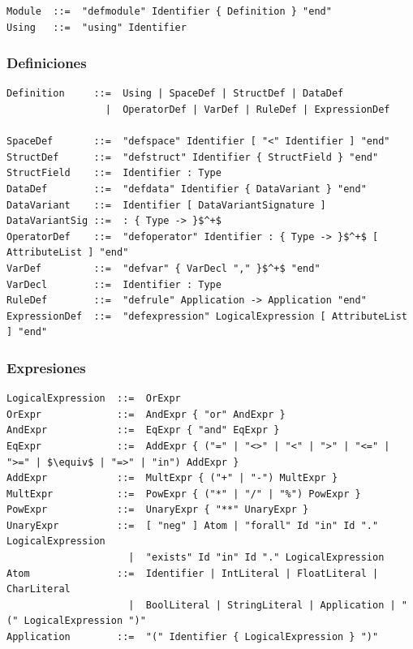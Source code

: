 \documentclass[12pt]{article}
\begin{document}
\begin{lstlisting}[style=rascalstyle, basicstyle=\ttfamily\small, mathescape]
Module  ::=  "defmodule" Identifier { Definition } "end"
Using   ::=  "using" Identifier
\end{lstlisting}

\subsubsection*{Definiciones}

\begin{lstlisting}[style=rascalstyle, basicstyle=\ttfamily\small, mathescape, breaklines=false]
Definition     ::=  Using | SpaceDef | StructDef | DataDef
                 |  OperatorDef | VarDef | RuleDef | ExpressionDef

SpaceDef       ::=  "defspace" Identifier [ "<" Identifier ] "end"
StructDef      ::=  "defstruct" Identifier { StructField } "end"
StructField    ::=  Identifier : Type
DataDef        ::=  "defdata" Identifier { DataVariant } "end"
DataVariant    ::=  Identifier [ DataVariantSignature ]
DataVariantSig ::=  : { Type -> }$^+$
OperatorDef    ::=  "defoperator" Identifier : { Type -> }$^+$ [ AttributeList ] "end"
VarDef         ::=  "defvar" { VarDecl "," }$^+$ "end"
VarDecl        ::=  Identifier : Type
RuleDef        ::=  "defrule" Application -> Application "end"
ExpressionDef  ::=  "defexpression" LogicalExpression [ AttributeList ] "end"
\end{lstlisting}

\subsubsection*{Expresiones}

\begin{lstlisting}[style=rascalstyle, basicstyle=\ttfamily\small, mathescape, breaklines=false]
LogicalExpression  ::=  OrExpr
OrExpr             ::=  AndExpr { "or" AndExpr }
AndExpr            ::=  EqExpr { "and" EqExpr }
EqExpr             ::=  AddExpr { ("=" | "<>" | "<" | ">" | "<=" | ">=" | $\equiv$ | "=>" | "in") AddExpr }
AddExpr            ::=  MultExpr { ("+" | "-") MultExpr }
MultExpr           ::=  PowExpr { ("*" | "/" | "%") PowExpr }
PowExpr            ::=  UnaryExpr { "**" UnaryExpr }
UnaryExpr          ::=  [ "neg" ] Atom | "forall" Id "in" Id "." LogicalExpression
                     |  "exists" Id "in" Id "." LogicalExpression
Atom               ::=  Identifier | IntLiteral | FloatLiteral | CharLiteral
                     |  BoolLiteral | StringLiteral | Application | "(" LogicalExpression ")"
Application        ::=  "(" Identifier { LogicalExpression } ")"
\end{lstlisting}
\end{document}
